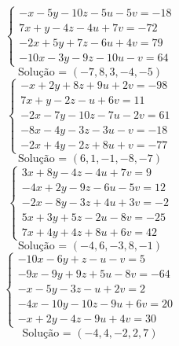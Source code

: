 \documentclass[12pt,oneside,a4paper,fleqn]{article}
\begin{document}
\begin{multicols*}{2}
\begin{equation*}
\begin{cases}
-x-5y-10z-5u-5v=-18 \\
7x+y-4z-4u+7v=-72 \\
-2x+5y+7z-6u+4v=79 \\
-10x-3y-9z-10u-v=64
\end{cases}
\end{equation*}
\begin{equation*}
\text{Solução = }\left(-7,8,3,-4,-5\right)
\end{equation*}
\vspace{\baselineskip}
\begin{equation*}
\begin{cases}
-x+2y+8z+9u+2v=-98 \\
7x+y-2z-u+6v=11 \\
-2x-7y-10z-7u-2v=61 \\
-8x-4y-3z-3u-v=-18 \\
-2x+4y-2z+8u+v=-77
\end{cases}
\end{equation*}
\begin{equation*}
\text{Solução = }\left(6,1,-1,-8,-7\right)
\end{equation*}
\vspace{\baselineskip}
\begin{equation*}
\begin{cases}
3x+8y-4z-4u+7v=9 \\
-4x+2y-9z-6u-5v=12 \\
-2x-8y-3z+4u+3v=-2 \\
5x+3y+5z-2u-8v=-25 \\
7x+4y+4z+8u+6v=42
\end{cases}
\end{equation*}
\begin{equation*}
\text{Solução = }\left(-4,6,-3,8,-1\right)
\end{equation*}
\vspace{\baselineskip}
\begin{equation*}
\begin{cases}
-10x-6y+z-u-v=5 \\
-9x-9y+9z+5u-8v=-64 \\
-x-5y-3z-u+2v=2 \\
-4x-10y-10z-9u+6v=20 \\
-x+2y-4z-9u+4v=30
\end{cases}
\end{equation*}
\begin{equation*}
\text{Solução = }\left(-4,4,-2,2,7\right)
\end{equation*}
\vspace{\baselineskip}

\end{multicols*}
\end{document}
